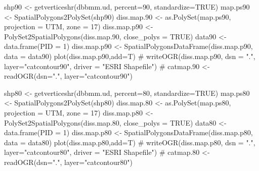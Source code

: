 \documentclass[
  letterpaper,
]{book}
\newenvironment{Shaded}{\begin{snugshade}}{\end{snugshade}}
\newcommand{\AttributeTok}[1]{\textcolor[rgb]{0.40,0.45,0.13}{#1}}
\newcommand{\CommentTok}[1]{\textcolor[rgb]{0.37,0.37,0.37}{#1}}
\newcommand{\ConstantTok}[1]{\textcolor[rgb]{0.56,0.35,0.01}{#1}}
\newcommand{\DecValTok}[1]{\textcolor[rgb]{0.68,0.00,0.00}{#1}}
\newcommand{\FloatTok}[1]{\textcolor[rgb]{0.68,0.00,0.00}{#1}}
\newcommand{\FunctionTok}[1]{\textcolor[rgb]{0.28,0.35,0.67}{#1}}
\newcommand{\NormalTok}[1]{\textcolor[rgb]{0.00,0.23,0.31}{#1}}
\newcommand{\OtherTok}[1]{\textcolor[rgb]{0.00,0.23,0.31}{#1}}
\newcommand{\StringTok}[1]{\textcolor[rgb]{0.13,0.47,0.30}{#1}}
\begin{document}
\begin{Shaded}
\begin{Highlighting}[]
\NormalTok{shp90 }\OtherTok{\textless{}{-}} \FunctionTok{getverticeshr}\NormalTok{(dbbmm.ud, }\AttributeTok{percent=}\DecValTok{90}\NormalTok{, }\AttributeTok{standardize=}\ConstantTok{TRUE}\NormalTok{)}
\NormalTok{map.ps90 }\OtherTok{\textless{}{-}} \FunctionTok{SpatialPolygons2PolySet}\NormalTok{(shp90)}
\NormalTok{diss.map}\FloatTok{.90} \OtherTok{\textless{}{-}} \FunctionTok{as.PolySet}\NormalTok{(map.ps90, }\AttributeTok{projection =} \StringTok{\textquotesingle{}UTM\textquotesingle{}}\NormalTok{, }\AttributeTok{zone =} \StringTok{\textquotesingle{}17\textquotesingle{}}\NormalTok{)}
\NormalTok{diss.map.p90 }\OtherTok{\textless{}{-}} \FunctionTok{PolySet2SpatialPolygons}\NormalTok{(diss.map}\FloatTok{.90}\NormalTok{, }\AttributeTok{close\_polys =} \ConstantTok{TRUE}\NormalTok{)}
\NormalTok{data90 }\OtherTok{\textless{}{-}} \FunctionTok{data.frame}\NormalTok{(}\AttributeTok{PID =} \DecValTok{1}\NormalTok{)}
\NormalTok{diss.map.p90 }\OtherTok{\textless{}{-}} \FunctionTok{SpatialPolygonsDataFrame}\NormalTok{(diss.map.p90, }\AttributeTok{data =}\NormalTok{ data90)}
\FunctionTok{plot}\NormalTok{(diss.map.p90,}\AttributeTok{add=}\NormalTok{T)}
\CommentTok{\# writeOGR(diss.map.p90, dsn = ".", layer="catcontour90", driver = "ESRI Shapefile")}
\CommentTok{\# catmap.90 \textless{}{-} readOGR(dsn=".", layer="catcontour90")}

\NormalTok{shp80 }\OtherTok{\textless{}{-}} \FunctionTok{getverticeshr}\NormalTok{(dbbmm.ud, }\AttributeTok{percent=}\DecValTok{80}\NormalTok{, }\AttributeTok{standardize=}\ConstantTok{TRUE}\NormalTok{)}
\NormalTok{map.ps80 }\OtherTok{\textless{}{-}} \FunctionTok{SpatialPolygons2PolySet}\NormalTok{(shp80)}
\NormalTok{diss.map}\FloatTok{.80} \OtherTok{\textless{}{-}} \FunctionTok{as.PolySet}\NormalTok{(map.ps80, }\AttributeTok{projection =} \StringTok{\textquotesingle{}UTM\textquotesingle{}}\NormalTok{, }\AttributeTok{zone =} \StringTok{\textquotesingle{}17\textquotesingle{}}\NormalTok{)}
\NormalTok{diss.map.p80 }\OtherTok{\textless{}{-}} \FunctionTok{PolySet2SpatialPolygons}\NormalTok{(diss.map}\FloatTok{.80}\NormalTok{, }\AttributeTok{close\_polys =} \ConstantTok{TRUE}\NormalTok{)}
\NormalTok{data80 }\OtherTok{\textless{}{-}} \FunctionTok{data.frame}\NormalTok{(}\AttributeTok{PID =} \DecValTok{1}\NormalTok{)}
\NormalTok{diss.map.p80 }\OtherTok{\textless{}{-}} \FunctionTok{SpatialPolygonsDataFrame}\NormalTok{(diss.map.p80, }\AttributeTok{data =}\NormalTok{ data80)}
\FunctionTok{plot}\NormalTok{(diss.map.p80,}\AttributeTok{add=}\NormalTok{T)}
\CommentTok{\# writeOGR(diss.map.p80, dsn = ".", layer="catcontour80", driver = "ESRI Shapefile")}
\CommentTok{\# catmap.80 \textless{}{-} readOGR(dsn=".", layer="catcontour80")}


\end{Highlighting}
\end{Shaded}
\end{document}
